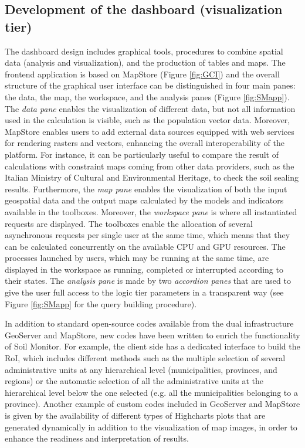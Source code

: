 \documentclass[APA,LATO1COL,doublespace]{WileyNJD-v2}
\newcommand{\update}[1]{\emph{\textcolor{blue}{#1}}}     %
\begin{document}
\subsection{Development of the dashboard (visualization tier) }
\label{sec:viewTier}
The dashboard design includes graphical tools, procedures to combine spatial data (analysis and visualization), and the production of tables and maps. 
The frontend application is based on MapStore (Figure \ref{fig:GCI}) and the overall structure of the graphical user interface can be distinguished in four main panes: the data, the map, the workspace, and the analysis panes (Figure \ref{fig:SMapp}).
The \textit{data pane} enables the visualization of different data, but not all information used in the calculation is visible, such as the population vector data. 
Moreover, MapStore enables users to add external data sources equipped with web services for rendering rasters and vectors, enhancing the overall interoperability of the platform. 
For instance, it can be particularly useful to compare the result of calculations with constraint maps coming from other data providers, such as the Italian Ministry of Cultural and Environmental Heritage, to check the soil sealing results. Furthermore, the \textit{map pane} enables the visualization of both the input geospatial data and the output maps calculated by the models and indicators available in the toolboxes. 
Moreover, the \textit{workspace pane} is where all instantiated requests are displayed. 
The toolboxes enable the allocation of several asynchronous requests per single user at the same time, which means that they can be calculated concurrently on the available CPU and GPU resources. 
The processes launched by users, which may be running at the same time, are displayed in the workspace as running, completed or interrupted according to their states. 
The \textit{analysis pane} is made by two \textit{accordion panes} that are used to give the user full access to the logic tier parameters in a transparent way (see Figure \ref{fig:SMapp} for the query building procedure).

In addition to standard open-source codes available from the dual infrastructure GeoServer and MapStore, new codes have been written to enrich the functionality of Soil Monitor. 
For example, the client side has a dedicated interface to build the RoI, which includes different methods such as the multiple selection of several administrative units at any hierarchical level (municipalities, provinces, and regions) or the automatic selection of all the administrative units at the hierarchical level below the one selected (e.g. all the municipalities belonging to a province). 
Another example of custom codes included in GeoServer and MapStore is given by the availability of different types of Highcharts plots that are generated dynamically in addition to the visualization of map images, in order to enhance the readiness and interpretation of results.
\end{document}
